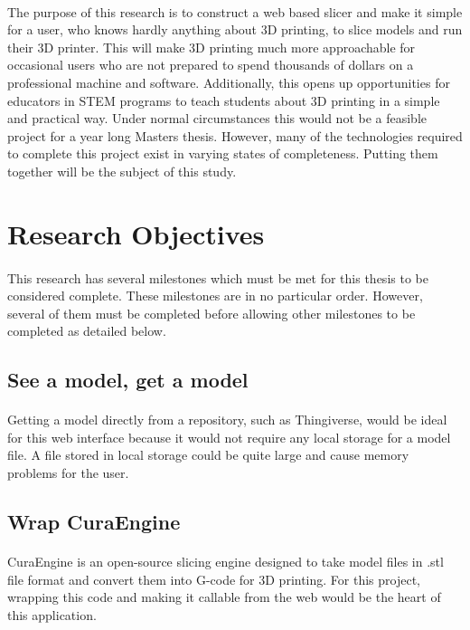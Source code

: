 \paragraph{}
The purpose of this research is to construct a web based slicer and make it simple for a user, who knows hardly anything about 3D printing, to slice models and run their 3D printer.
This will make 3D printing much more approachable for occasional users who are not prepared to spend thousands of dollars on a professional machine and software.
Additionally, this opens up opportunities for educators in STEM programs to teach students about 3D printing in a simple and practical way.
Under normal circumstances this would not be a feasible project for a year long Masters thesis.
However, many of the technologies required to complete this project exist in varying states of completeness.
Putting them together will be the subject of this study.


\section{Research Objectives}
\paragraph{}
This research has several milestones which must be met for this thesis to be considered complete.
These milestones are in no particular order.
However, several of them must be completed before allowing other milestones to be completed as detailed below.

\subsection{See a model, get a model}
\paragraph{}
Getting a model directly from a repository, such as Thingiverse, would be ideal for this web interface because it would not require any local storage for a model file.
A file stored in local storage could be quite large and cause memory problems for the user. 

\subsection{Wrap CuraEngine}
\paragraph{}
CuraEngine is an open-source slicing engine designed to take model files in .stl file format and convert them into G-code for 3D printing.
For this project, wrapping this code and making it callable from the web would be the heart of this application.

